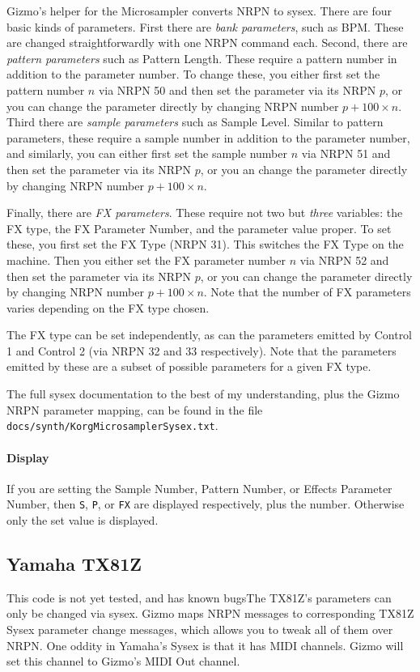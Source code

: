 \documentclass{article}
\begin{document}
Gizmo's helper for the Microsampler converts NRPN to sysex.  There are four basic kinds of parameters.  First there are {\it bank parameters}, such as BPM.  These are changed straightforwardly with one NRPN command each.  Second, there are {\it pattern parameters} such as Pattern Length.  These require a pattern number in addition to the parameter number.  To change these, you either first set the pattern number \(n\) via NRPN 50 and then set the parameter via its NRPN \(p\), or you can change the parameter  directly by changing NRPN number \(p + 100 \times n\).  Third there are {\it sample parameters} such as Sample Level.  Similar to pattern parameters, these require a sample number in addition to the parameter number, and similarly, you can either first set the sample number \(n\) via NRPN 51 and then set the parameter via its NRPN \(p\), or you an change the parameter directly by changing NRPN number \(p + 100 \times n\).  

Finally, there are {\it FX parameters}.  These require not two but {\it three} variables: the FX type, the FX Parameter Number, and the parameter value proper.  To set these, you first set the FX Type (NRPN 31).  This switches the FX Type on the machine.  Then you either set the FX parameter number \(n\) via NRPN 52 and then set the parameter via its NRPN \(p\), or you can change the parameter directly by changing NRPN number \(p + 100 \times n\).  Note that the number of FX parameters varies depending on the FX type chosen.

The FX type can be set independently, as can the parameters emitted by Control 1 and Control 2 (via NRPN 32 and 33 respectively).  Note that the parameters emitted by these are a subset of possible parameters for a given FX type.

The full sysex documentation to the best of my understanding, plus the Gizmo NRPN parameter mapping, can be found in the file \texttt{docs/synth/KorgMicrosamplerSysex.txt}.


\paragraph{Display} If you are setting the Sample Number, Pattern Number, or Effects Parameter Number, then \texttt{S}, \texttt{P}, or \texttt{FX} are displayed respectively, plus the number.  Otherwise only the set value is displayed.

\subsection{Yamaha TX81Z} {\color{red} This code is not yet tested, and has known bugs}\quad The TX81Z's parameters can only be changed via sysex.  Gizmo maps NRPN messages to corresponding TX81Z Sysex parameter change messages, which allows you to tweak all of them over NRPN.   One oddity in Yamaha's Sysex is that it has MIDI channels.  Gizmo will set this channel to Gizmo's MIDI Out channel.
\end{document}
